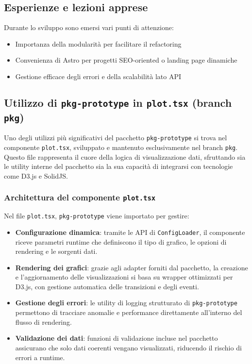 \subsection{Esperienze e lezioni apprese}
Durante lo sviluppo sono emersi vari punti di attenzione:
\begin{itemize}
    \item Importanza della modularità per facilitare il refactoring
    \item Convenienza di Astro per progetti SEO-oriented o landing page dinamiche
    \item Gestione efficace degli errori e della scalabilità lato API
\end{itemize}

\subsection{Utilizzo di \texttt{pkg-prototype} in \texttt{plot.tsx} (branch \texttt{pkg})}
Uno degli utilizzi più significativi del pacchetto \texttt{pkg-prototype} si trova nel componente \texttt{plot.tsx}, sviluppato e mantenuto esclusivamente nel branch \texttt{pkg}. Questo file rappresenta il cuore della logica di visualizzazione dati, sfruttando sia le utility interne del pacchetto sia la sua capacità di integrarsi con tecnologie come D3.js e SolidJS.

\subsubsection{Architettura del componente \texttt{plot.tsx}}
Nel file \texttt{plot.tsx}, \texttt{pkg-prototype} viene importato per gestire:
\begin{itemize}
    \item \textbf{Configurazione dinamica}: tramite le API di \texttt{ConfigLoader}, il componente riceve parametri runtime che definiscono il tipo di grafico, le opzioni di rendering e le sorgenti dati.
    \item \textbf{Rendering dei grafici}: grazie agli adapter forniti dal pacchetto, la creazione e l’aggiornamento delle visualizzazioni si basa su wrapper ottimizzati per D3.js, con gestione automatica delle transizioni e degli eventi.
    \item \textbf{Gestione degli errori}: le utility di logging strutturato di \texttt{pkg-prototype} permettono di tracciare anomalie e performance direttamente all’interno del flusso di rendering.
    \item \textbf{Validazione dei dati}: funzioni di validazione incluse nel pacchetto assicurano che solo dati coerenti vengano visualizzati, riducendo il rischio di errori a runtime.
\end{itemize}


